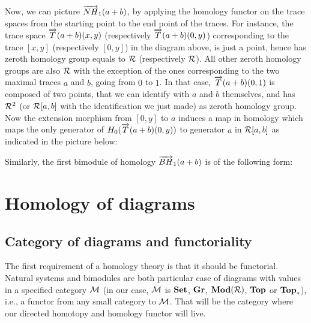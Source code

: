 Now, we can picture $\overrightarrow{NH}_{1}(a+b)$, by applying the
homology functor on the trace spaces from the starting point to the end
point of the traces. For instance, the trace
space $\overrightarrow{T}(a+b)(x,y)$ (respectively 
$\overrightarrow{T}(a+b)(0,y)$) corresponding to the trace $[x,y]$ 
(respectively $[0,y]$) in the diagram
above, is just a point, hence has zeroth homology group equals to $\mathcal{R}$
(respectively $\mathcal{R}$). 
All other zeroth homology groups are also $\mathcal{R}$ with the exception of 
the ones corresponding to the two maximal traces 
$a$ and $b$, going from $0$ to $1$. In that case, 
$\overrightarrow{T}(a+b)(0,1)$ is composed of two points, that we can identify with
$a$ and $b$ themselves, and has $\mathcal{R}^2$ (or $\mathcal{R}[a,b]$ with the identification we just
made) as
zeroth homology group. Now the extension morphism from $[0,y]$ to $a$ induces
a map in homology which maps the only generator of $H_0(\overrightarrow{T}(a+b)(0,y))$
to generator $a$ in $\mathcal{R}[a,b]$ as indicated in the picture below:
	\begin{figure}[H]
		\begin{center}
    			
  		\end{center}
	\end{figure}
Similarly, the first bimodule of homology $\overrightarrow{BH}_{1}(a+b)$ is of the following form:
	\begin{figure}[H]
		\begin{center}
    			
  		\end{center}
	\end{figure}



\section{Homology of diagrams}
\label{sec:homdiag}

	\subsection{Category of diagrams and functoriality}
	
	The first requirement of a homology theory is that it should be functorial. Natural systems and bimodules are both particular case of diagrams with values in a specified category $\mathcal{M}$ (in our case, $\mathcal{M}$ is $\textbf{Set}$, $\textbf{Gr}$, $\textbf{Mod}(\mathcal{R})$, $\textbf{Top}$ or $\textbf{Top}_\ast$), i.e., a functor from any small category to $\mathcal{M}$. That will be the category where our directed homotopy and homology functor will live.
	
